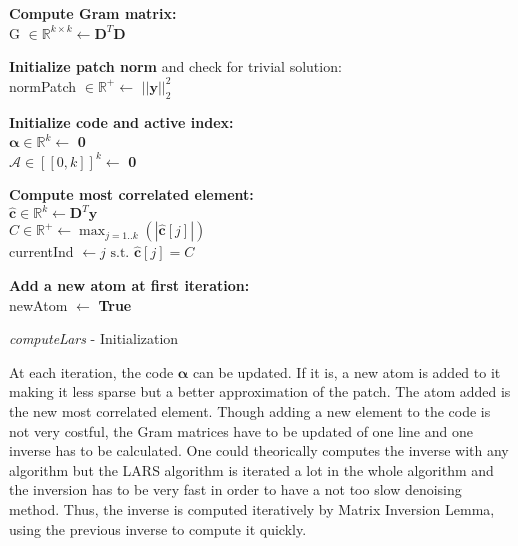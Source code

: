 \documentclass{ipol}
\newcommand{\dsize}{k}
\newcommand{\dict}{\textbf{D}}
\newcommand{\code}{\bm{\alpha}}
\newcommand{\noi}{\textbf{y}}
\newcommand{\clars}{\hat{\textbf{c}}}
\newcommand{\A}{\mathcal{A}}
\newcommand{\RR}{\mathbb{R}}
\begin{document}
\begin{algorithm}[H]

\textbf{Compute Gram matrix:}\\
\vspace{0.5mm}
G $\in \mathbb{R}^{\dsize \times \dsize} \leftarrow \dict^T\dict$\\
\vspace{2mm}

\textbf{Initialize patch norm} and check for trivial solution:\\
\vspace{0.5mm}
normPatch $\in \mathbb{R}^+ \leftarrow$ $||\noi||^2_2$\\
\vspace{2mm}

\textbf{Initialize code and active index:}\\
\vspace{0.5mm}
$\code \in \mathbb{R}^{\dsize} \leftarrow$ \textbf{0}\\
$\A \in [\![0, \dsize]\!]^{\dsize} \leftarrow$ \textbf{0}\\
\vspace{2mm}

\textbf{Compute most correlated element:}\\
\vspace{0.5mm}
$\clars \in \RR^{\dsize} \leftarrow \dict^T \noi$\\
$C \in \RR^+ \leftarrow \max_{j=1..\dsize}(|\clars[j]|)$ \\
currentInd $\leftarrow j \text{ s.t. } \clars[j] = C$\\
\vspace{2mm}

\textbf{Add a new atom at first iteration:}\\
\vspace{0.5mm}
newAtom $\leftarrow$ \textbf{True}\\
\vspace{2mm}

\caption{\textit{computeLars} - Initialization}
\end{algorithm}

\newpage

\noindent At each iteration, the code $\code$ can be updated. If it is, a new atom is added to it making it less sparse but a better approximation of the patch. The atom added is the new most correlated element. Though adding a new element to the code is not very costful, the Gram matrices have to be updated of one line and one inverse has to be calculated. One could theorically computes the inverse with any algorithm but the LARS algorithm is iterated a lot in the whole algorithm and the inversion has to be very fast in order to have a not too slow denoising method. Thus, the inverse is computed iteratively by Matrix Inversion Lemma, using the previous inverse to compute it quickly.\\
\end{document}

